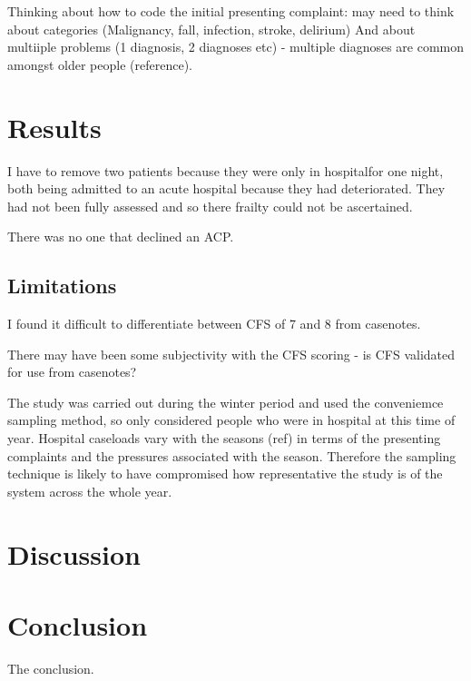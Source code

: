 \documentclass
[
	12pt,
	a4paper,
	oneside,
]{report}
\begin{document}
Thinking about how to code the initial presenting complaint: may need to think about
categories (Malignancy, fall, infection, stroke, delirium) And about multiiple problems
(1 diagnosis, 2 diagnoses etc) - multiple diagnoses are 
common amongst older people (reference).

\chapter{Results}
I have to remove two patients because they were only in hospitalfor one night,
both being admitted to an acute hospital because they had deteriorated. They
had not been fully assessed and so there frailty could not be ascertained.

There was no one that declined an ACP.

\section{Limitations}
I found it difficult to differentiate between CFS of 7 and 8 from casenotes.

There may have been some subjectivity with the CFS scoring - is CFS validated 
for use from casenotes?

The study was carried out during the winter period and used the conveniemce
sampling method, so only considered people who were in hospital at this time 
of year. Hospital caseloads vary with the seasons (ref) in terms of the 
presenting complaints and the pressures associated with the season. Therefore
the sampling technique is likely to have compromised how representative the
study is of the system across the whole year.

\chapter{Discussion}

\chapter{Conclusion}
The conclusion.

\printbibliography[heading=bibintoc]

\clearpage

\appendix
\end{document}

